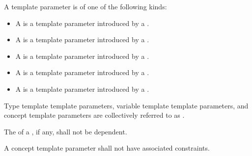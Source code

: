 \pnum
A template parameter is of one of the following kinds:
\begin{itemize}
\item
A  is
a template parameter introduced by a .
\item
A  is
a template parameter introduced by a .
\item
A  is
a template parameter introduced by a .
\item
A  is
a template parameter introduced by a .
\item
A  is
a template parameter introduced by a .
\end{itemize}

\pnum
Type template template parameters,
variable template template parameters, and
concept template parameters
are collectively referred to as .

\pnum
The  of a ,
if any, shall not be dependent.

\pnum
A concept template parameter shall not have
associated constraints.

